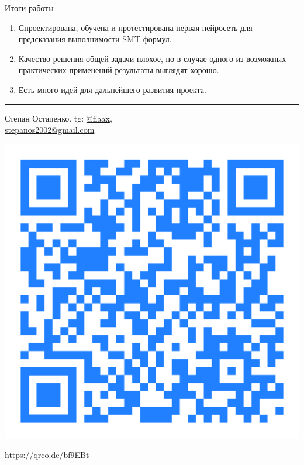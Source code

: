 \documentclass[14pt,aspectratio=169,hyperref={pdftex,unicode},xcolor=dvipsnames]{beamer}
\begin{document}
\begin{frame}{Итоги работы}

\begin{enumerate}
  \item Спроектирована, обучена и протестирована первая нейросеть для предсказания выполнимости SMT-формул.
  \item Качество решения общей задачи плохое, но в случае одного из возможных практических применений результаты выглядят хорошо.
  \item Есть много идей для дальнейшего развития проекта.
\end{enumerate}

\vspace{2mm}\hrule

\begin{minipage}{0.5\textwidth}
\begin{center}

Степан Остапенко. tg: \href{https://t.me/flaax}{@flaax}, \\ \href{mailto:stepanos2002@gmail.com}{stepanos2002@gmail.com}

\end{center}
\end{minipage}%
\begin{minipage}{0.5\textwidth}
\begin{center}

\includegraphics[scale=0.03]{./assets/booklet-qr.pdf}

{\small \url{https://qrco.de/bf9EBt}}

\end{center}
\end{minipage}

\end{frame}
\end{document}
